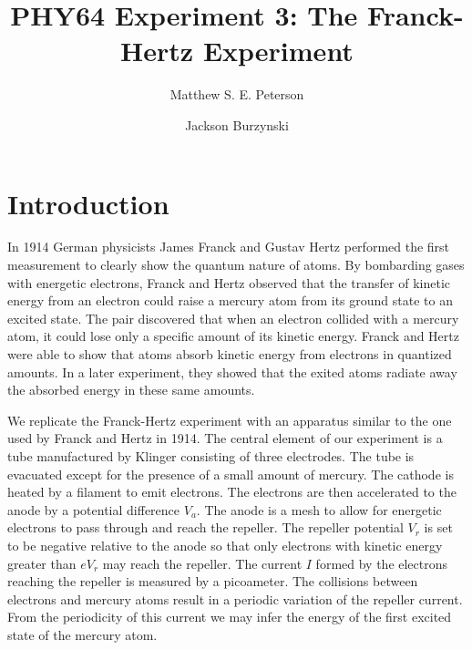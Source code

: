 \documentclass[aps, reprint,amsmath,amssymb]{revtex4-1} %
\begin{document}
\title{PHY64 Experiment 3: The Franck-Hertz Experiment}
\author{Matthew S. E. Peterson}
\author{Jackson Burzynski}
\maketitle

\section{Introduction}
In 1914 German physicists James Franck and Gustav Hertz performed the first measurement to clearly show the quantum nature of atoms. By bombarding gases with energetic electrons, Franck and Hertz observed that the transfer of kinetic energy from an electron could raise a mercury atom from its ground state to an excited state. The pair discovered that when an electron collided with a mercury atom, it could lose only a specific amount of its kinetic energy. Franck and Hertz were able to show that atoms absorb kinetic energy from electrons in quantized amounts. In a later experiment, they showed that the exited atoms radiate away the absorbed energy in these same amounts.

We replicate the Franck-Hertz experiment with an apparatus similar to the one used by Franck and Hertz in 1914. The central element of our experiment is a tube manufactured by Klinger consisting of three electrodes. The tube is evacuated except for the presence of a small amount of mercury. The cathode is heated by a filament to emit electrons. The electrons are then accelerated to the anode by a potential difference $V_a$. The anode is a mesh to allow for energetic electrons to pass through and reach the repeller. The repeller potential $V_r$ is set to be negative relative to the anode so that only electrons with kinetic energy greater than $eV_r$ may reach the repeller. The current $I$ formed by the electrons reaching the repeller is measured by a picoameter. The collisions between electrons and mercury atoms result in a periodic variation of the repeller current. From the periodicity of this current we may infer the energy of the first excited state of the mercury atom.
\end{document}

